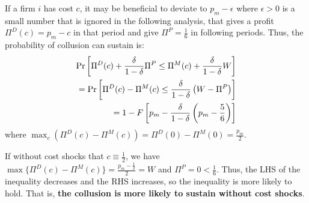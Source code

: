 \documentclass[12pt]{article}
\begin{document}
If a firm $i$ has cost $c$, it may be beneficial to deviate to $p_m-\epsilon$ where $\epsilon>0$ is a small number that is ignored in the following analysis, that gives a profit $\Pi^D(c)=p_m-c$ in that period and give $\Pi^P=\frac{1}{6}$ in following periods. Thus, the probability of collusion can sustain is:
\begin{equation}
    \begin{aligned}
        \textnormal{Pr}\left[\Pi^D(c)+\frac{\delta}{1-\delta}\Pi^P\leq \Pi^M(c)+\frac{\delta}{1-\delta}W\right]\\
        =\textnormal{Pr}\left[\Pi^D(c)-\Pi^M(c)\leq \frac{\delta}{1-\delta}\left(W-\Pi^P\right)\right]\\
        =1-F\left[p_m-\frac{\delta}{1-\delta}\left(p_m-\frac{5}{6}\right)\right]
        \end{aligned}
        \nonumber
\end{equation}
where $\max_c\left(\Pi^D(c)-\Pi^M(c)\right)=\Pi^D(0)-\Pi^M(0)=\frac{p_m}{2}$.

If without cost shocks that $c\equiv \frac{1}{2}$, we have $\max\{\Pi^D(c)-\Pi^M(c)\}=\frac{p_m-\frac{1}{2}}{2}=W$ and $\Pi^P=0<\frac{1}{6}$. Thus, the LHS of the inequality decreases and the RHS increases, so the inequality is more likely to hold. That is, \textbf{the collusion is more likely to sustain without cost shocks}.
\end{document}
